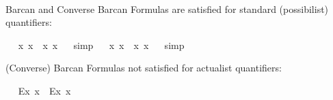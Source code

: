 \begin{isabellebody}
\ \isamarkupfalse%
\ {\isachardoublequoteopen}{\isasymlfloor}{\isasymphi}{\isasymrfloor}\ {\isasymlongrightarrow}\ {\isasymlfloor}{\isasymxi}{\isasymrfloor}\ {\isasymLongrightarrow}\ {\isasymlfloor}{\isasymphi}\ \isactrlbold {\isasymrightarrow}\ {\isasymxi}{\isasymrfloor}{\isachardoublequoteclose}\ \isamarkupfalse%
%
\isadelimproof
\ %
\endisadelimproof
%
\isatagproof
{}\isamarkupfalse%
\ %
%
\endisatagproof
{\isafoldproof}%
%
\isadelimproof
%
\endisadelimproof
%
\begin{isamarkuptext}%
Barcan and Converse Barcan Formulas are satisfied for standard (possibilist) quantifiers:%
\end{isamarkuptext}\isamarkuptrue%
\ \isamarkupfalse%
\ {\isachardoublequoteopen}{\isasymlfloor}{\isacharparenleft}\isactrlbold {\isasymforall}x{\isachardot}\isactrlbold {\isasymbox}{\isacharparenleft}{\isasymphi}\ x{\isacharparenright}{\isacharparenright}\ \isactrlbold {\isasymrightarrow}\ \isactrlbold {\isasymbox}{\isacharparenleft}\isactrlbold {\isasymforall}x{\isachardot}{\isacharparenleft}{\isasymphi}\ x{\isacharparenright}{\isacharparenright}{\isasymrfloor}{\isachardoublequoteclose}%
\isadelimproof
\ %
\endisadelimproof
%
\isatagproof
{}\isamarkupfalse%
\ simp%
\endisatagproof
{\isafoldproof}%
%
\isadelimproof
%
\endisadelimproof
\isanewline
\ \isamarkupfalse%
\ {\isachardoublequoteopen}{\isasymlfloor}\isactrlbold {\isasymbox}{\isacharparenleft}\isactrlbold {\isasymforall}x{\isachardot}{\isacharparenleft}{\isasymphi}\ x{\isacharparenright}{\isacharparenright}\ \isactrlbold {\isasymrightarrow}\ {\isacharparenleft}\isactrlbold {\isasymforall}x{\isachardot}\isactrlbold {\isasymbox}{\isacharparenleft}{\isasymphi}\ x{\isacharparenright}{\isacharparenright}{\isasymrfloor}{\isachardoublequoteclose}%
\isadelimproof
\ %
\endisadelimproof
%
\isatagproof
{}\isamarkupfalse%
\ simp%
\endisatagproof
{\isafoldproof}%
%
\isadelimproof
%
\endisadelimproof
%
\begin{isamarkuptext}%
(Converse) Barcan Formulas not satisfied for actualist quantifiers:%
\end{isamarkuptext}\isamarkuptrue%
\ \isamarkupfalse%
\ {\isachardoublequoteopen}{\isasymlfloor}{\isacharparenleft}\isactrlbold {\isasymforall}\isactrlsup Ex{\isachardot}\isactrlbold {\isasymbox}{\isacharparenleft}{\isasymphi}\ x{\isacharparenright}{\isacharparenright}\ \isactrlbold {\isasymrightarrow}\ \isactrlbold {\isasymbox}{\isacharparenleft}\isactrlbold {\isasymforall}\isactrlsup Ex{\isachardot}{\isacharparenleft}{\isasymphi}\ x{\isacharparenright}{\isacharparenright}{\isasymrfloor}{\isachardoublequoteclose}\ \isamarkupfalse%

\end{isabellebody}
